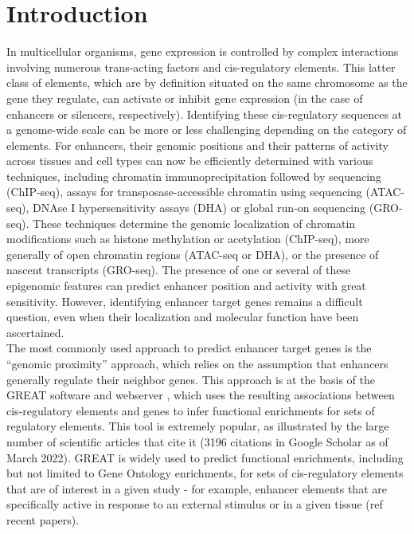 \section{Introduction}
In multicellular organisms, gene expression is controlled by complex interactions involving numerous trans-acting factors and \acrshort{cis}-regulatory elements. This latter class of elements, which are by definition situated on the same chromosome as the gene they regulate, can activate or inhibit gene expression (in the case of enhancers or silencers, respectively). Identifying these \acrshort{cis}-regulatory sequences at a genome-wide scale can be more or less challenging depending on the category of elements. For enhancers, their genomic positions and their patterns of activity across tissues and cell types can now be efficiently determined with various techniques, including chromatin immunoprecipitation followed by sequencing (ChIP-seq), assays for transposase-accessible chromatin using sequencing (ATAC-seq), DNAse I hypersensitivity assays (DHA) or global run-on sequencing (GRO-seq). These techniques determine the genomic localization of chromatin modifications such as histone methylation or acetylation (ChIP-seq), more generally of open chromatin regions (ATAC-seq or DHA), or the presence of nascent transcripts (GRO-seq). The presence of one or several of these epigenomic features can predict enhancer position and activity with great sensitivity. However, identifying enhancer target genes remains a difficult question, even when their localization and molecular function have been ascertained. \\

The most commonly used approach to predict enhancer target genes is the “genomic proximity” approach, which relies on the assumption that enhancers generally regulate their neighbor genes. This approach is at the basis of the GREAT software and webserver \citep{mclean_great_2010}, which uses the resulting associations between \acrshort{cis}-regulatory elements and genes to infer functional enrichments for sets of regulatory elements. This tool is extremely popular, as illustrated by the large number of scientific articles that cite it (3196 citations in Google Scholar as of March 2022). GREAT is widely used to predict functional enrichments, including but not limited to Gene Ontology enrichments, for sets of \acrshort{cis}-regulatory elements that are of interest in a given study - for example, enhancer elements that are specifically active in response to an external stimulus or in a given tissue (ref recent papers). \\ 

